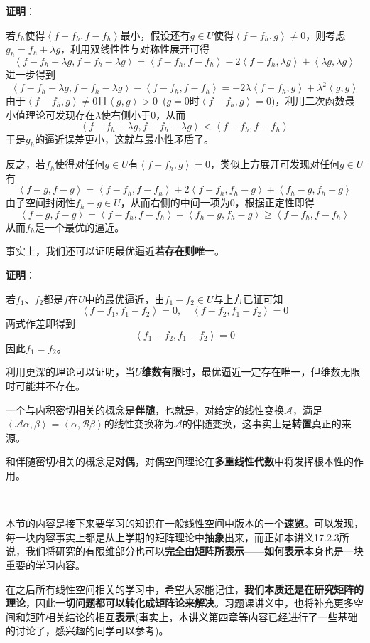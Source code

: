 \documentclass[a4paper,UTF8,fontset=windows,AutoFakeBold]{ctexart}
\newcommand*{\ma}{\mathcal{A}}
\newcommand*{\mb}{\mathcal{B}}
\newcommand*{\note}{\noindent *}
\newcommand{\proo}[1]{{\vspace{5pt}\kaishu\noindent\textbf{证明}：\vspace{-3pt}
\begin{compactitem}
    \item[] #1
\end{compactitem}
}}
\begin{document}
\proo{
    若$f_h$使得$\left<f-f_h,f-f_h\right>$最小，假设还有$g\in U$使得$\left<f-f_h,g\right>\ne0$，则考虑$g_h=f_h+\lambda g$，利用双线性性与对称性展开可得
    $$\left<f-f_h-\lambda g,f-f_h-\lambda g\right>=\left<f-f_h,f-f_h\right>-2\left<f-f_h,\lambda g\right>+\left<\lambda g,\lambda g\right>$$
    进一步得到
    $$\left<f-f_h-\lambda g,f-f_h-\lambda g\right>-\left<f-f_h,f-f_h\right>=-2\lambda\left<f-f_h,g\right>+\lambda^2\left<g,g\right>$$
    由于$\left<f-f_h,g\right>\ne0$且$\left<g,g\right>>0$\ ($g=0$时$\left<f-f_h,g\right>=0$)，利用二次函数最小值理论可发现存在$\lambda$使右侧小于0，从而
    $$\left<f-f_h-\lambda g,f-f_h-\lambda g\right><\left<f-f_h,f-f_h\right>$$
    于是$g_h$的逼近误差更小，这就与最小性矛盾了。

    反之，若$f_h$使得对任何$g\in U$有$\left<f-f_h,g\right>=0$，类似上方展开可发现对任何$g\in U$有
    $$\left<f-g,f-g\right>=\left<f-f_h,f-f_h\right>+2\left<f-f_h,f_h-g\right>+\left<f_h-g,f_h-g\right>$$
    由子空间封闭性$f_h-g\in U$，从而右侧的中间一项为0，根据正定性即得
    $$\left<f-g,f-g\right>=\left<f-f_h,f-f_h\right>+\left<f_h-g,f_h-g\right>\ge\left<f-f_h,f-f_h\right>$$
    从而$f_h$是一个最优的逼近。
}

事实上，我们还可以证明最优逼近\textbf{若存在则唯一}。

\proo{
    若$f_1$、$f_2$都是$f$在$U$中的最优逼近，由$f_1-f_2\in U$与上方已证可知
    $$\left<f-f_1,f_1-f_2\right>=0,\quad\left<f-f_2,f_1-f_2\right>=0$$
    两式作差即得到
    $$\left<f_1-f_2,f_1-f_2\right>=0$$
    因此$f_1=f_2$。
}

\note 利用更深的理论可以证明，当$U$\textbf{维数有限}时，最优逼近一定存在唯一，但维数无限时可能并不存在。

\note 一个与内积密切相关的概念是\textbf{伴随}，也就是，对给定的线性变换$\ma$，满足$\left<\ma\alpha,\beta\right>=\left<\alpha,\mb\beta\right>$的线性变换称为$\ma$的伴随变换，这事实上是\textbf{转置}真正的来源。

\note 和伴随密切相关的概念是\textbf{对偶}，对偶空间理论在\textbf{多重线性代数}中将发挥根本性的作用。

\

本节的内容是接下来要学习的知识在一般线性空间中版本的一个\textbf{速览}。可以发现，每一块内容事实上都是从上学期的矩阵理论中\textbf{抽象}出来，而正如本讲义17.2.3所说，我们将研究的有限维部分也可以\textbf{完全由矩阵所表示}——\textbf{如何表示}本身也是一块重要的学习内容。

在之后所有线性空间相关的学习中，希望大家能记住，\textbf{我们本质还是在研究矩阵的理论}，因此\textbf{一切问题都可以转化成矩阵论来解决}。习题课讲义中，也将补充更多空间和矩阵相关结论的相互\textbf{表示}(事实上，本讲义第四章等内容已经进行了一些基础的讨论了，感兴趣的同学可以参考)。
\end{document}
